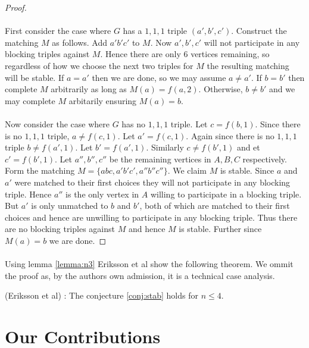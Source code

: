 \begin{proof}
\paragraph{} First consider the case where $G$ has a $1,1,1$ triple $(a',b',c')$. Construct the matching $M$ as follows. Add $a'b'c'$ to $M$. Now $a',b',c'$ will not participate in any blocking triples against $M$. Hence there are only $6$ vertices remaining, so regardless of how we choose the next two triples for $M$ the resulting matching will be stable. If $a = a'$ then we are done, so we may assume $a\neq a'$. If $b = b'$ then complete $M$ arbitrarily as long as $M(a) = f(a,2)$. Otherwise, $b\neq b'$ and we may complete $M$ arbitarily ensuring $M(a) = b$.
\paragraph{} Now consider the case where $G$ has no $1,1,1$ triple. Let $c = f(b,1)$. Since there is no $1,1,1$ triple, $a \neq f(c,1)$. Let $a' = f(c,1)$. Again since there is no $1,1,1$ triple $b \neq f(a',1)$. Let $b' = f(a',1)$. Similarly $c \neq f(b',1)$ and et $c' = f(b',1)$. Let $a'', b'', c''$ be the remaining vertices in $A,B,C$ respectively. Form the matching $M = \{abc,a'b'c',a''b''c''\}$. We claim $M$ is stable. Since $a$ and $a'$ were matched to their first choices they will not participate in any blocking triple. Hence $a''$ is the only vertex in $A$ willing to participate in a blocking triple. But $a'$ is only unmatched to $b$ and $b'$, both of which are matched to their first choices and hence are unwilling to participate in any blocking triple. Thus there are no blocking triples against $M$ and hence $M$ is stable. Further since $M(a) = b$ we are done. 
\end{proof}
\paragraph{}
Using lemma \ref{lemma:n3} Eriksson et al show the following theorem. We ommit the proof as, by the authors own admission, it is a technical case analysis.
\begin{theorem}(Eriksson et al) \label{theorem:n4} \cite{eriksson2006three}: The conjecture \ref{conj:stab} holds for $n\leq 4$.
\end{theorem}
\section{Our Contributions}
